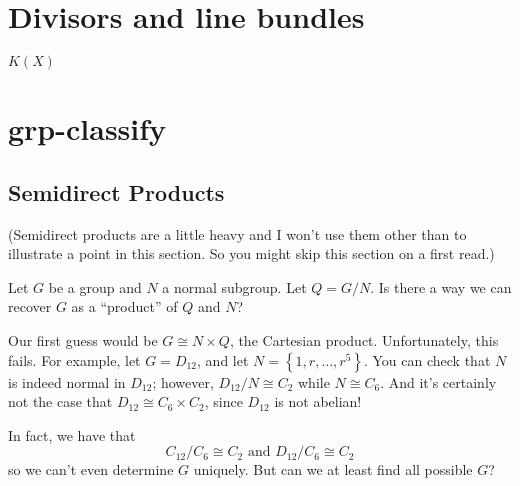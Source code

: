 \chapter{Divisors and line bundles}
$K(X)$ 


\chapter{grp-classify}
\section{Semidirect Products}
(Semidirect products are a little heavy and I won't use them other than to illustrate a point in this section.
So you might skip this section on a first read.)

Let $G$ be a group and $N$ a normal subgroup.
Let $Q = G/N$.
Is there a way we can recover $G$ as a ``product'' of $Q$ and $N$?

Our first guess would be $G \cong N \times Q$, the Cartesian product.
Unfortunately, this fails.
For example, let $G = D_{12}$, and let $N = \left\{ 1,r,\dots,r^5 \right\}$.
You can check that $N$ is indeed normal in $D_{12}$; however, $D_{12}/N \cong C_2$ while $N \cong C_6$.
And it's certainly not the case that $D_{12} \cong C_6 \times C_2$, since
$D_{12}$ is not abelian!

In fact, we have that
\[ C_{12} / C_6 \cong C_2 \text{ and } D_{12} / C_6 \cong C_2 \]
so we can't even determine $G$ uniquely.
But can we at least find all possible $G$?

